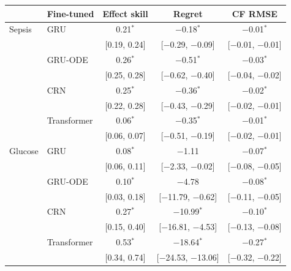 \begin{tabular}{llccc}
\toprule
 & Fine-tuned & Effect skill & Regret & CF RMSE \\
\midrule
Sepsis & GRU & 0.21$^{*}$ & $-$0.18$^{*}$ & $-$0.01$^{*}$ \\
 &  & {\scriptsize[0.19, 0.24]} & {\scriptsize[$-$0.29, $-$0.09]} & {\scriptsize[$-$0.01, $-$0.01]} \\[2pt]
 & GRU-ODE & 0.26$^{*}$ & $-$0.51$^{*}$ & $-$0.03$^{*}$ \\
 &  & {\scriptsize[0.25, 0.28]} & {\scriptsize[$-$0.62, $-$0.40]} & {\scriptsize[$-$0.04, $-$0.02]} \\[2pt]
 & CRN & 0.25$^{*}$ & $-$0.36$^{*}$ & $-$0.02$^{*}$ \\
 &  & {\scriptsize[0.22, 0.28]} & {\scriptsize[$-$0.43, $-$0.29]} & {\scriptsize[$-$0.02, $-$0.01]} \\[2pt]
 & Transformer & 0.06$^{*}$ & $-$0.35$^{*}$ & $-$0.01$^{*}$ \\
 &  & {\scriptsize[0.06, 0.07]} & {\scriptsize[$-$0.51, $-$0.19]} & {\scriptsize[$-$0.02, $-$0.01]} \\[2pt]
\midrule
Glucose & GRU & 0.08$^{*}$ & $-$1.11 & $-$0.07$^{*}$ \\
 &  & {\scriptsize[0.06, 0.11]} & {\scriptsize[$-$2.33, $-$0.02]} & {\scriptsize[$-$0.08, $-$0.05]} \\[2pt]
 & GRU-ODE & 0.10$^{*}$ & $-$4.78 & $-$0.08$^{*}$ \\
 &  & {\scriptsize[0.03, 0.18]} & {\scriptsize[$-$11.79, $-$0.62]} & {\scriptsize[$-$0.11, $-$0.05]} \\[2pt]
 & CRN & 0.27$^{*}$ & $-$10.99$^{*}$ & $-$0.10$^{*}$ \\
 &  & {\scriptsize[0.15, 0.40]} & {\scriptsize[$-$16.81, $-$4.53]} & {\scriptsize[$-$0.13, $-$0.08]} \\[2pt]
 & Transformer & 0.53$^{*}$ & $-$18.64$^{*}$ & $-$0.27$^{*}$ \\
 &  & {\scriptsize[0.34, 0.74]} & {\scriptsize[$-$24.53, $-$13.06]} & {\scriptsize[$-$0.32, $-$0.22]} \\[2pt]
\bottomrule
\end{tabular}
